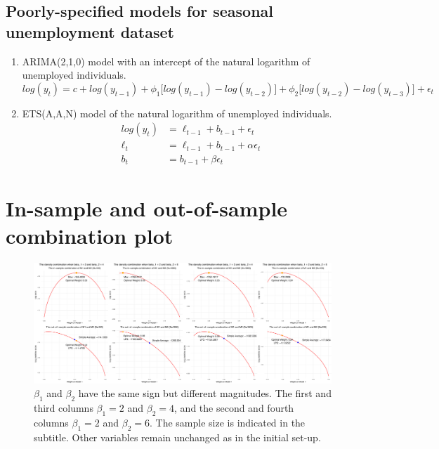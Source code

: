 \documentclass{monashthesis}
\begin{document}
\hypertarget{poorly-specified-models-for-seasonal-unemployment-dataset}{%
\subsection{Poorly-specified models for seasonal unemployment dataset}\label{poorly-specified-models-for-seasonal-unemployment-dataset}}

\begin{enumerate}
\def\labelenumi{\arabic{enumi}.}
\item
  ARIMA(2,1,0) model with an intercept of the natural logarithm of unemployed individuals.
  \begin{equation*}
  log(y_t) = c + log(y_{t-1}) + \phi_1\big[log(y_{t-1})-log(y_{t-2})\big] + \phi_2\big[log(y_{t-2})-log(y_{t-3})\big] + \epsilon_t
  \end{equation*}
\item
  ETS(A,A,N) model of the natural logarithm of unemployed individuals.
  \begin{align*}
  log(y_t) &= \ell_{t-1} + b_{t-1} + \epsilon_t \\
  \ell_t &= \ell_{t-1} + b_{t-1} + \alpha \epsilon_t \\
  b_t &= b_{t-1} + \beta \epsilon_t
  \end{align*}
\end{enumerate}

\hypertarget{plot}{%
\section{In-sample and out-of-sample combination plot}\label{plot}}

\begin{figure}[ht]
\centering
\includegraphics[scale=0.18, angle=90]{figures/betamag11.jpg}
\caption{$\beta_1$ and $\beta_2$ have the same sign but different magnitudes. The first and third columns $\beta_1=2$ and $\beta_2=4$, and the second and fourth columns $\beta_1=2$ and $\beta_2=6$. The sample size is indicated in the subtitle. Other variables remain unchanged as in the initial set-up.}
\label{fig:magnitude}
\end{figure}
\end{document}
